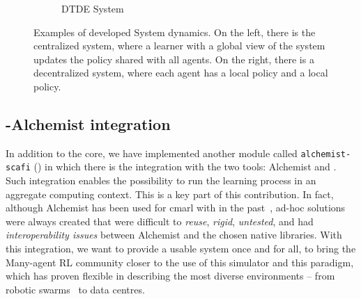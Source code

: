 \begin{figure}[t]
\begin{subfigure}[b]{0.49\textwidth}
        \caption{DTDE System}
        \label{coordination2023:fig:dtde}
    \end{subfigure}
\caption[Examples of developed System dynamics in \scarlib{}]{Examples of developed System dynamics. 
On the left, there is the centralized system, 
where a learner with a global view of the system 
updates the policy shared with all agents. 
%
On the right, there is a decentralized system, 
where each agent has a local policy and a local policy.}
\end{figure}

\subsection{\scafi{}-Alchemist integration} In addition to the core, we have implemented another module called \texttt{alchemist-scafi} () 
 in which there is the integration with the two tools: 
 Alchemist \cite{DBLP:journals/jos/PianiniMV13} and \scafi{} \cite{Casadei2022}.
%
Such integration enables the possibility to run the learning process 
 in an aggregate computing context.
This is a key part of this contribution. 
 In fact, although Alchemist has been used for \ac{cmarl} with \scafi{} in the past~\cite{Aguzzi2022,DBLP:conf/acsos/AguzziCV22}, 
 ad-hoc solutions were always created that were difficult to \emph{reuse}, 
 \emph{rigid}, \emph{untested}, and had \emph{interoperability issues} between Alchemist 
 and the chosen native libraries.
With this integration, 
 we want to provide a usable system once and for all, 
 to bring the Many-agent RL community closer 
 to the use of this simulator and this paradigm, 
 which has proven flexible in describing the most diverse environments -- 
 from robotic swarms~\cite{Casadei2021} to data centres.

